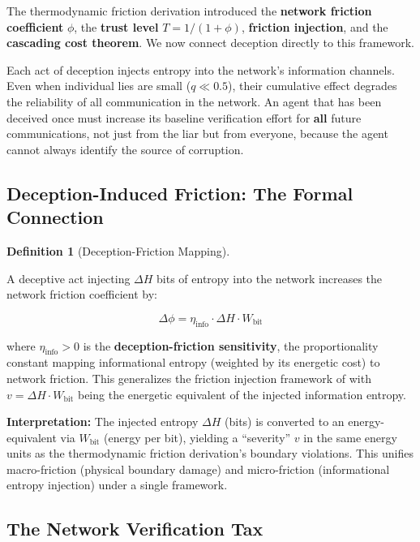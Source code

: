 \documentclass[11pt]{article}
\theoremstyle{plain}
\theoremstyle{definition}
\newtheorem{definition}{Definition}
\theoremstyle{remark}
\let\origsubsection\subsection
\renewcommand{\subsection}{\needspace{7\baselineskip}\origsubsection}
\begin{document}
The thermodynamic friction derivation \citep{TC-IV} introduced the
\textbf{network friction coefficient} \(\phi\), the \textbf{trust level}
\(T = 1/(1 + \phi)\), \textbf{friction injection}, and the
\textbf{cascading cost theorem}. We now connect deception directly to
this framework.

Each act of deception injects entropy into the network's information
channels. Even when individual lies are small (\(q \ll 0.5\)), their
cumulative effect degrades the reliability of all communication in the
network. An agent that has been deceived once must increase its baseline
verification effort for \textbf{all} future communications, not just
from the liar but from everyone, because the agent cannot always
identify the source of corruption.

\subsection{Deception-Induced Friction: The Formal
Connection}\label{deception-induced-friction-the-formal-connection}

\begin{definition}[Deception-Friction Mapping]
\label{def-deception-friction-mapping}

A deceptive act injecting $\Delta H$ bits of entropy into the network increases the network friction coefficient by:

$$\Delta \phi = \eta_{\text{info}} \cdot \Delta H \cdot W_{\text{bit}}$$

where $\eta_{\text{info}} > 0$ is the \textbf{deception-friction sensitivity}, the proportionality constant mapping informational entropy (weighted by its energetic cost) to network friction. This generalizes the friction injection framework of \citep{TC-IV} with $v = \Delta H \cdot W_{\text{bit}}$ being the energetic equivalent of the injected information entropy.
\end{definition}

\textbf{Interpretation:} The injected entropy \(\Delta H\) (bits) is
converted to an energy-equivalent via \(W_{\text{bit}}\) (energy per
bit), yielding a ``severity'' \(v\) in the same energy units as the
thermodynamic friction derivation's boundary violations. This unifies
macro-friction (physical boundary damage) and micro-friction
(informational entropy injection) under a single framework.

\subsection{The Network Verification
Tax}\label{the-network-verification-tax}
\end{document}
